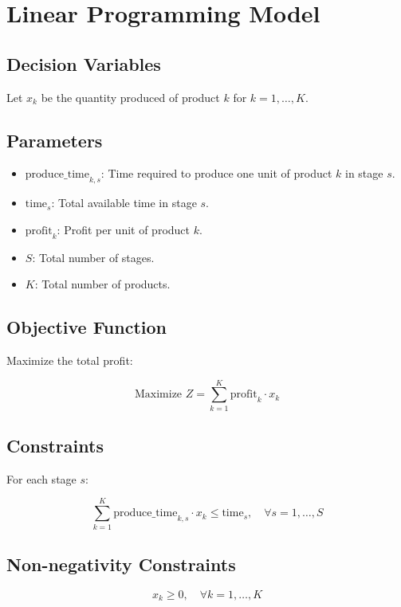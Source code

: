 \documentclass{article}
\begin{document}
\section*{Linear Programming Model}

\subsection*{Decision Variables}
Let \( x_k \) be the quantity produced of product \( k \) for \( k = 1, \ldots, K \).

\subsection*{Parameters}
\begin{itemize}
    \item \( \text{produce\_time}_{k,s} \): Time required to produce one unit of product \( k \) in stage \( s \).
    \item \( \text{time}_{s} \): Total available time in stage \( s \).
    \item \( \text{profit}_{k} \): Profit per unit of product \( k \).
    \item \( S \): Total number of stages.
    \item \( K \): Total number of products.
\end{itemize}

\subsection*{Objective Function}
Maximize the total profit:

\[
\text{Maximize } Z = \sum_{k=1}^{K} \text{profit}_{k} \cdot x_k
\]

\subsection*{Constraints}
For each stage \( s \):

\[
\sum_{k=1}^{K} \text{produce\_time}_{k,s} \cdot x_k \leq \text{time}_{s}, \quad \forall s = 1, \ldots, S
\]

\subsection*{Non-negativity Constraints}
\[
x_k \geq 0, \quad \forall k = 1, \ldots, K
\]
\end{document}
